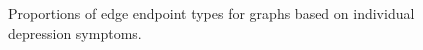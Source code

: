 \documentclass[
]{article}
\begin{document}
\begin{figure}


\caption{\label{fig-sym-mat}Proportions of edge endpoint types for
graphs based on individual depression symptoms.}

\end{figure}%
\end{document}
